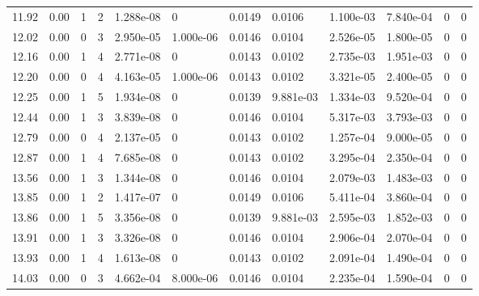 \documentclass[preview]{standalone}
\begin{document}
{{{\begin{tabular}{L{1.2cm}C{1.2cm} C{0.3cm}C{0.5cm} C{1.4cm}C{1.4cm} C{1.4cm}C{1.4cm} C{1.6cm}C{1.6cm} C{1.6cm}C{1.6cm}}
  11.92  &  0.00  & 1     &  2 &  1.288e-08  & 0  &  0.0149&   0.0106& 1.100e-03 & 7.840e-04   &  0 & 0  \\ 
  12.02  &  0.00  & 0     &  3 &  2.950e-05  & 1.000e-06  &  0.0146&   0.0104& 2.526e-05 & 1.800e-05   &  0 & 0  \\ 
  12.16  &  0.00  & 1     &  4 &  2.771e-08  & 0  &  0.0143&   0.0102& 2.735e-03 & 1.951e-03   &  0 & 0  \\ 
  12.20  &  0.00  & 0     &  4 &  4.163e-05  & 1.000e-06  &  0.0143&   0.0102& 3.321e-05 & 2.400e-05   &  0 & 0  \\ 
  12.25  &  0.00  & 1     &  5 &  1.934e-08  & 0  &  0.0139&   9.881e-03& 1.334e-03 & 9.520e-04   &  0 & 0  \\ 
  12.44  &  0.00  & 1     &  3 &  3.839e-08  & 0  &  0.0146&   0.0104& 5.317e-03 & 3.793e-03   &  0 & 0  \\ 
  12.79  &  0.00  & 0     &  4 &  2.137e-05  & 0  &  0.0143&   0.0102& 1.257e-04 & 9.000e-05   &  0 & 0  \\ 
  12.87  &  0.00  & 1     &  4 &  7.685e-08  & 0  &  0.0143&   0.0102& 3.295e-04 & 2.350e-04   &  0 & 0  \\ 
  13.56  &  0.00  & 1     &  3 &  1.344e-08  & 0  &  0.0146&   0.0104& 2.079e-03 & 1.483e-03   &  0 & 0  \\ 
  13.85  &  0.00  & 1     &  2 &  1.417e-07  & 0  &  0.0149&   0.0106& 5.411e-04 & 3.860e-04   &  0 & 0  \\ 
  13.86  &  0.00  & 1     &  5 &  3.356e-08  & 0  &  0.0139&   9.881e-03& 2.595e-03 & 1.852e-03   &  0 & 0  \\ 
  13.91  &  0.00  & 1     &  3 &  3.326e-08  & 0  &  0.0146&   0.0104& 2.906e-04 & 2.070e-04   &  0 & 0  \\ 
  13.93  &  0.00  & 1     &  4 &  1.613e-08  & 0  &  0.0143&   0.0102& 2.091e-04 & 1.490e-04   &  0 & 0  \\ 
  14.03  &  0.00  & 0     &  3 &  4.662e-04  & 8.000e-06  &  0.0146&   0.0104& 2.235e-04 & 1.590e-04   &  0 & 0  \\ 
\hline 
\end{tabular} 

}}}
\end{document}
